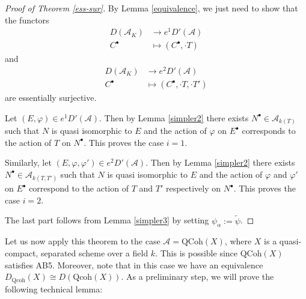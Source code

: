 \documentclass{amsart}
\begin{document}
\begin{proof}[Proof of Theorem \ref{ess-sur}]
By Lemma \ref{equivalence}, we just need to show that the functors
\begin{align*}
D(\mathcal{A}_{K}) &{\rightarrow} e^{1}D'(\mathcal{A})\\
C^{\bullet} &\mapsto (C^{\bullet},\cdot T)
\end{align*}
and
\begin{align*}
D(\mathcal{A}_{K}) &{\rightarrow} e^{2}D'(\mathcal{A})\\
C^{\bullet} &\mapsto (C^{\bullet},\cdot T,\cdot T')
\end{align*}
are essentially surjective.

Let $(E,\varphi)\in e^{1}D'(\mathcal{A})$. Then by Lemma \ref{simpler2} there exists $N^{\bullet}\in \mathcal{A}_{k(T)}$ such that $N$ is quasi isomorphic to $E$ and the action of $\varphi$ on $E^{\bullet}$ corresponds to the action of $T$ on $N^{\bullet}$. This proves the case $i=1$.

Similarly, let $(E,\varphi,\varphi')\in e^{2}D'(\mathcal{A})$. Then by Lemma \ref{simpler2} there exists $N^{\bullet}\in \mathcal{A}_{k(T,T')}$ such that $N$ is quasi isomorphic to $E$ and the action of $\varphi$ and $\varphi'$ on $E^{\bullet}$ correspond to the action of $T$ and $T'$ respectively on $N^{\bullet}$. This proves the case $i=2$.

The last part follows from Lemma \ref{simpler3} by setting $\psi_{\alpha}:=\tilde{\psi}$.
\end{proof}

Let us now apply this theorem to the case $\mathcal{A}=\text{QCoh}(X)$, where $X$ is a quasi-compact, separated scheme over a field $k$. This is possible since $\text{QCoh}(X)$ satisfies AB5. Moreover, note that in this case we have an equivalence $D_{\text{Qcoh}}(X)\cong D(\text{Qcoh}(X))$. As a preliminary step, we will prove the following technical lemma:
\end{document}
